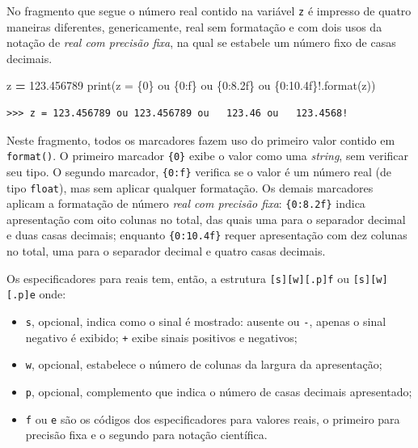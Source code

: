 \documentclass[
]{book}
\newenvironment{Shaded}{\begin{snugshade}}{\end{snugshade}}
\newcommand{\BuiltInTok}[1]{#1}
\newcommand{\FloatTok}[1]{\textcolor[rgb]{0.00,0.00,0.81}{#1}}
\newcommand{\NormalTok}[1]{#1}
\newcommand{\OperatorTok}[1]{\textcolor[rgb]{0.81,0.36,0.00}{\textbf{#1}}}
\newcommand{\SpecialCharTok}[1]{\textcolor[rgb]{0.00,0.00,0.00}{#1}}
\newcommand{\StringTok}[1]{\textcolor[rgb]{0.31,0.60,0.02}{#1}}
\providecommand{\tightlist}{%
  \setlength{\itemsep}{0pt}\setlength{\parskip}{0pt}}
\begin{document}
No fragmento que segue o número real contido na variável \texttt{z} é impresso de quatro maneiras diferentes, genericamente, real sem formatação e com dois usos da notação de \emph{real com precisão fixa}, na qual se estabele um número fixo de casas decimais.

\begin{Shaded}
\begin{Highlighting}[]
\NormalTok{z }\OperatorTok{=} \FloatTok{123.456789}
\BuiltInTok{print}\NormalTok{(}\StringTok{\textquotesingle{}z = }\SpecialCharTok{\{0\}}\StringTok{ ou }\SpecialCharTok{\{0:f\}}\StringTok{ ou }\SpecialCharTok{\{0:8.2f\}}\StringTok{ ou }\SpecialCharTok{\{0:10.4f\}}\StringTok{!\textquotesingle{}}\NormalTok{.}\BuiltInTok{format}\NormalTok{(z))}
\end{Highlighting}
\end{Shaded}

\begin{verbatim}
>>> z = 123.456789 ou 123.456789 ou   123.46 ou   123.4568!
\end{verbatim}

Neste fragmento, todos os marcadores fazem uso do primeiro valor contido em \texttt{format()}. O primeiro marcador \texttt{\{0\}} exibe o valor como uma \emph{string}, sem verificar seu tipo. O segundo marcador, \texttt{\{0:f\}} verifica se o valor é um número real (de tipo \texttt{float}), mas sem aplicar qualquer formatação. Os demais marcadores aplicam a formatação de número \emph{real com precisão fixa}: \texttt{\{0:8.2f\}} indica apresentação com oito colunas no total, das quais uma para o separador decimal e duas casas decimais; enquanto \texttt{\{0:10.4f\}} requer apresentação com dez colunas no total, uma para o separador decimal e quatro casas decimais.

Os especificadores para reais tem, então, a estrutura \texttt{{[}s{]}{[}w{]}{[}.p{]}f} ou \texttt{{[}s{]}{[}w{]}{[}.p{]}e} onde:

\begin{itemize}
\tightlist
\item
  \texttt{s}, opcional, indica como o sinal é mostrado: ausente ou \texttt{-}, apenas o sinal negativo é exibido; \texttt{+} exibe sinais positivos e negativos;
\item
  \texttt{w}, opcional, estabelece o número de colunas da largura da apresentação;
\item
  \texttt{p}, opcional, complemento que indica o número de casas decimais apresentado;
\item
  \texttt{f} ou \texttt{e} são os códigos dos especificadores para valores reais, o primeiro para precisão fixa e o segundo para notação científica.
\end{itemize}
\end{document}

